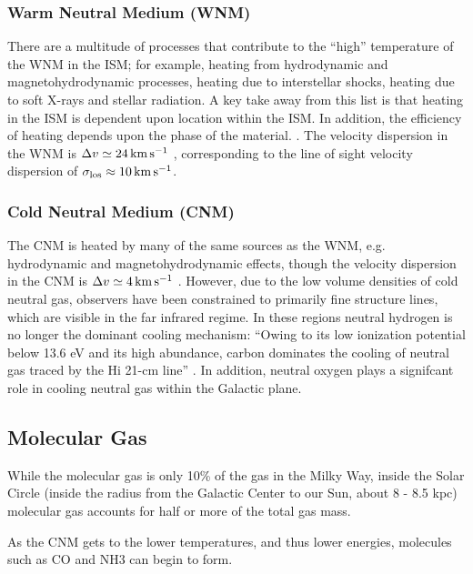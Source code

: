 \documentclass[../dissertation.tex]{subfiles}
\begin{document}
\subsubsection{Warm Neutral Medium (WNM)} %
There are a multitude of processes that contribute to the ``high'' temperature of the WNM in the ISM; 
for example, heating from hydrodynamic and magnetohydrodynamic processes, heating due to interstellar shocks, heating due to soft X-rays and stellar radiation.
A key take away from this list is that heating in the ISM is dependent upon location within the ISM. 
In addition, the efficiency of heating depends upon the phase of the material. \citep[p. 48]{2009ARA&A..47...27K}. 
The velocity dispersion in the WNM is $\Delta v \simeq 24 \,\rm km\,s^{-1}$ \citep[p. 49]{2009ARA&A..47...27K}, corresponding to the line of sight velocity dispersion of $\sigma_{\rm los} \approx 10 \,\rm km\,s^{-1}$.


\subsubsection{Cold Neutral Medium (CNM)}
The CNM is heated by many of the same sources as the WNM, 
e.g. hydrodynamic and magnetohydrodynamic effects, though the velocity dispersion in the CNM is $\Delta v \simeq 4 \,\rm km\,s^{-1}$ \citep[p. 49]{2009ARA&A..47...27K}.
However, due to the low volume densities of cold neutral gas, observers have been constrained to 
primarily fine structure lines, which are visible in the far infrared regime. 
In these regions neutral hydrogen is no longer the dominant cooling mechanism: 
``Owing to its low ionization potential below 13.6 eV and its high abundance, carbon dominates the cooling of neutral gas traced by the Hi 21-cm line'' \citep[p. 48]{2009ARA&A..47...27K}. 
In addition, neutral oxygen plays a signifcant role in cooling neutral gas within the Galactic plane.

\citet{1987ApJ...319..730S}

\subsection{Molecular Gas}
While the molecular gas is only 10\% of the gas in the Milky Way, inside the Solar Circle (inside the radius from the Galactic Center to our Sun, about 8 - 8.5 kpc) 
molecular gas accounts for half or more of the total gas mass. 

As the CNM gets to the lower temperatures, and thus lower energies, molecules such as CO and NH3 can begin to form. \citep[p. 47]{2009ARA&A..47...27K}
\end{document}
